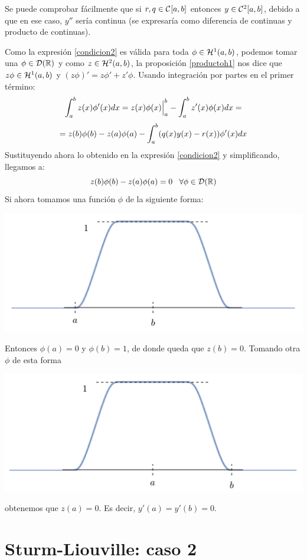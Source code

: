 Se puede comprobar fácilmente que si $r,q\in\continuas$ entonces $y\in\continuas[2]$, debido a que en ese caso, $y''$ sería continua (se expresaría como diferencia de continuas y producto de continuas).

Como la expresión \eqref{condicion2} es válida para toda $\phi\in\sobolev{1}$, podemos tomar una $\phi\in\mathcal{D}(\R)$ y como $z\in\sobolev{2}$, la proposición \ref{productoh1} nos dice que $z\phi\in\sobolev{1}$ y $\left(z\phi\right)'=z\phi'+z'\phi$. Usando integración por partes en el primer término:
\[
\integral{a}{b}{z(x)\phi'(x)dx}=z(x)\phi(x)\Big|_a^b-\integral{a}{b}{z'(x)\phi(x)dx}=
\]
\[
=z(b)\phi(b)-z(a)\phi(a)-\integral{a}{b}{(q(x)y(x)-r(x))\phi'(x)dx}
\]
Sustituyendo ahora lo obtenido en la expresión \eqref{condicion2} y simplificando, llegamos a:
\[
z(b)\phi(b)-z(a)\phi(a)=0 \espacio \forall \phi \in\mathcal{D}(\R)
\]
Si ahora tomamos una función $\phi$ de la siguiente forma:

\centerline{\includegraphics[scale=0.5]{img/caso1.png}} 

Entonces $\phi(a)=0$ y $\phi(b)=1$, de donde queda que $z(b)=0$. Tomando otra $\phi$ de esta forma
\centerline{\includegraphics[scale=0.5]{img/caso2.png}} 

obtenemos que $z(a)=0$. Es decir, $y'(a)=y'(b)=0$.

\section{Sturm-Liouville: caso 2}

